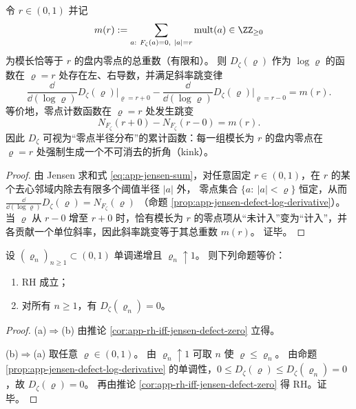 \begin{corollary}\label{cor:app-jensen-defect-kink-structure}
令 \(r\in(0,1)\) 并记
\[
m(r):=\sum_{a:\ F_{\zeta}(a)=0,\ |a|=r}\mathrm{mult}(a)\in\ZZ_{\ge 0}
\]
为模长恰等于 \(r\) 的盘内零点的总重数（有限和）。
则 \(D_{\zeta}(\varrho)\) 作为 \(\log\varrho\) 的函数在 \(\varrho=r\) 处存在左、右导数，并满足斜率跳变律
\[
\frac{\dd}{\dd(\log\varrho)}D_{\zeta}(\varrho)\Big|_{\varrho=r+0}
-\frac{\dd}{\dd(\log\varrho)}D_{\zeta}(\varrho)\Big|_{\varrho=r-0}
=m(r).
\]
等价地，零点计数函数在 \(\varrho=r\) 处发生跳变
\[
N_{F_{\zeta}}(r+0)-N_{F_{\zeta}}(r-0)=m(r).
\]
因此 \(D_{\zeta}\) 可视为“零点半径分布”的累计函数：每一组模长为 \(r\) 的盘内零点在 \(\varrho=r\) 处强制生成一个不可消去的折角（kink）。
\end{corollary}
\begin{proof}
由 Jensen 求和式 \eqref{eq:app-jensen-sum}，对任意固定 \(r\in(0,1)\)，在 \(r\) 的某个去心邻域内除去有限多个阈值半径 \(|a|\) 外，
零点集合 \(\{a:\ |a|<\varrho\}\) 恒定，从而
\(
\frac{\dd}{\dd(\log\varrho)}D_{\zeta}(\varrho)=N_{F_{\zeta}}(\varrho)
\)
（命题 \ref{prop:app-jensen-defect-log-derivative}）。
当 \(\varrho\) 从 \(r-0\) 增至 \(r+0\) 时，恰有模长为 \(r\) 的零点项从“未计入”变为“计入”，并各贡献一个单位斜率，因此斜率跳变等于其总重数 \(m(r)\)。
证毕。
\end{proof}

\begin{theorem}[任意趋近列的可数化判据]\label{thm:app-jensen-countable-criterion}
设 \((\varrho_n)_{n\ge 1}\subset(0,1)\) 单调递增且 \(\varrho_n\uparrow 1\)。
则下列命题等价：
\begin{enumerate}
  \item[(a)] RH 成立；
  \item[(b)] 对所有 \(n\ge 1\)，有 \(D_{\zeta}(\varrho_n)=0\)。
\end{enumerate}
\end{theorem}
\begin{proof}
(a)\(\Rightarrow\)(b) 由推论 \ref{cor:app-rh-iff-jensen-defect-zero} 立得。
\par
(b)\(\Rightarrow\)(a) 取任意 \(\varrho\in(0,1)\)。
由 \(\varrho_n\uparrow 1\) 可取 \(n\) 使 \(\varrho\le \varrho_n\)。
由命题 \ref{prop:app-jensen-defect-log-derivative} 的单调性，\(0\le D_{\zeta}(\varrho)\le D_{\zeta}(\varrho_n)=0\)，故 \(D_{\zeta}(\varrho)=0\)。
再由推论 \ref{cor:app-rh-iff-jensen-defect-zero} 得 RH。证毕。
\end{proof}

